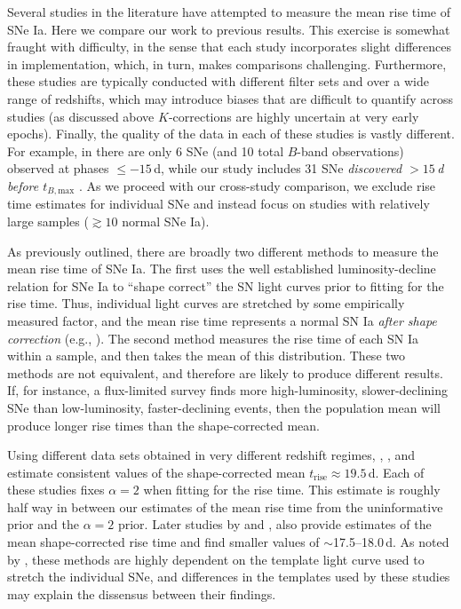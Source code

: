 \documentclass[twocolumn]{./aastex63}
\newcommand{\trise}{$t_\mathrm{rise}$}
\newcommand{\tbmax}{$t_{B,\mathrm{max}}$}
\begin{document}
Several studies in the literature have attempted to measure the mean rise time
of SNe Ia. Here we compare our work to previous results. This exercise is
somewhat fraught with difficulty, in the sense that each study incorporates
slight differences in implementation, which, in turn, makes comparisons
challenging. Furthermore, these studies are typically conducted with different
filter sets and over a wide range of redshifts, which may introduce biases
that are difficult to quantify across studies (as discussed above
$K$-corrections are highly uncertain at very early epochs). Finally, the
quality of the data in each of these studies is vastly different. For example,
in \citet{Riess99a} there are only 6 SNe (and 10 total $B$-band observations)
observed at phases $\le -15$\,d, while our study includes 31 SNe
\textit{discovered $> 15$\,d before \tbmax} \citep{Yao19}. As we proceed with
our cross-study comparison, we exclude rise time estimates for individual SNe
and instead focus on studies with relatively large samples ($\gtrsim 10$
normal SNe Ia).

As previously outlined, there are broadly two different methods to measure the
mean rise time of SNe Ia. The first uses the well established
luminosity-decline relation for SNe Ia \citep{Phillips93} to ``shape correct''
the SN light curves prior to fitting for the rise time. Thus, individual light
curves are stretched by some empirically measured factor, and the mean rise
time represents a normal SN Ia \textit{after shape correction} (e.g.,
\citealt{Riess99a,Aldering00,Conley06,Hayden10,Ganeshalingam11}). The second
method measures the rise time of each SN Ia within a sample, and then takes
the mean of this distribution. These two methods are not equivalent, and
therefore are likely to produce different results. If, for instance, a
flux-limited survey finds more high-luminosity, slower-declining SNe than
low-luminosity, faster-declining events, then the population mean will produce
longer rise times than the shape-corrected mean.

Using different data sets obtained in very different redshift regimes,
\citet{Riess99a}, \citet{Aldering00}, and \citet{Conley06} estimate consistent
values of the shape-corrected mean \trise$ \approx 19.5$\,d. Each of these
studies fixes $\alpha = 2$ when fitting for the rise time. This estimate is
roughly half way in between our estimates of the mean rise time from the
uninformative prior and the $\alpha = 2$ prior. Later studies by
\citet{Hayden10} and \citet{Ganeshalingam11}, also provide estimates of the
mean shape-corrected rise time and find smaller values of $\sim$17.5--18.0\,d.
As noted by \citeauthor{Hayden10}, these methods are highly dependent on the
template light curve used to stretch the individual SNe, and differences in
the templates used by these studies may explain the dissensus between their
findings.
\end{document}
